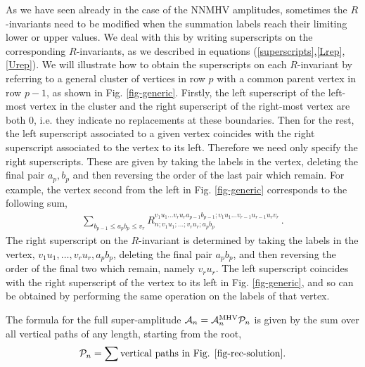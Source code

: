 \documentclass[12pt]{article}
\def \be  {\begin{equation}}
\def \ee  {\end{equation}}
\begin{document}
{As we have seen already in the case of the NNMHV amplitudes, sometimes the $R$-invariants need to be modified when the summation labels reach their limiting lower or upper values. We deal with this by writing superscripts on the corresponding $R$-invariants, as we described in equations (\ref{superscripts},\ref{Lrep},\ref{Urep}). We will illustrate how to obtain the superscripts on each $R$-invariant by referring to a general cluster of vertices in row $p$ with a common parent vertex in row $p-1$, as shown in Fig. \ref{fig-generic}. Firstly, the left superscript of the left-most vertex in the cluster and the right superscript of the right-most vertex are both 0, i.e. they indicate no replacements at these boundaries. Then for the rest, the left superscript associated to a given vertex coincides with the right superscript associated to the vertex to its left. Therefore we need only specify the right superscripts. These are given by taking the labels in the vertex, deleting the
  final pair $a_p,b_p$ and then reversing the order of the last pair which remain. For example, the vertex second from the left in Fig. \ref{fig-generic} corresponds to the following sum,
\begin{align}
\sum_{b_{p-1} \leq a_pb_p \leq v_r} \!\!\!\!\!\! R_{n;v_1u_1;\ldots;v_ru_r;a_pb_p}^{v_1u_1\ldots v_ru_ra_{p-1}b_{p-1};v_1u_1\ldots v_{r-1}u_{r-1}u_rv_r}  \, .
\end{align}
The right superscript on the $R$-invariant is determined by taking the labels in the vertex, $v_1u_1,\ldots,v_ru_r,a_pb_p$, deleting the final pair $a_pb_p$, and then reversing the order of the final two which remain, namely $v_ru_r$. The left superscript coincides with the right superscript of the vertex to its left in Fig. \ref{fig-generic}, and so can be obtained by performing the same operation on the labels of that vertex.

The formula for
the full super-amplitude $\mathcal{A}_n = \mathcal{A}_n^{\rm MHV} \mathcal{P}_n$ is given by the sum over all vertical paths
of any length, starting from the root,
\be
\label{paths}
\mathcal{P}_n = \sum \text{vertical paths in Fig. \ref{fig-rec-solution}}.
\ee

}
\end{document}
